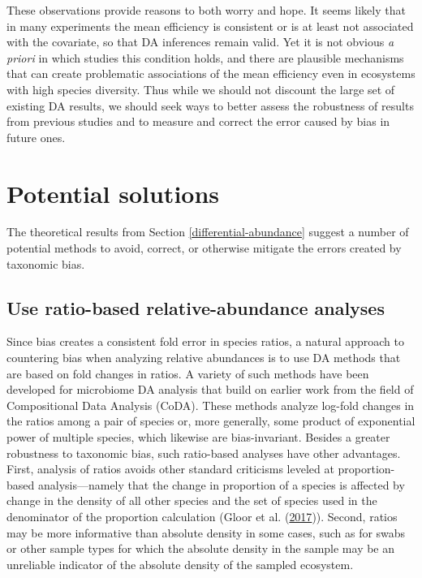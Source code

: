 \documentclass[
]{article}
\begin{document}
These observations provide reasons to both worry and hope.
It seems likely that in many experiments the mean efficiency is consistent or is at least not associated with the covariate, so that DA inferences remain valid.
Yet it is not obvious \emph{a priori} in which studies this condition holds, and there are plausible mechanisms that can create problematic associations of the mean efficiency even in ecosystems with high species diversity.
Thus while we should not discount the large set of existing DA results, we should seek ways to better assess the robustness of results from previous studies and to measure and correct the error caused by bias in future ones.

\hypertarget{solutions}{%
\section{Potential solutions}\label{solutions}}

The theoretical results from Section \ref{differential-abundance} suggest a number of potential methods to avoid, correct, or otherwise mitigate the errors created by taxonomic bias.

\hypertarget{use-ratio-based-relative-abundance-analyses}{%
\subsection{Use ratio-based relative-abundance analyses}\label{use-ratio-based-relative-abundance-analyses}}

Since bias creates a consistent fold error in species ratios, a natural approach to countering bias when analyzing relative abundances is to use DA methods that are based on fold changes in ratios.
A variety of such methods have been developed for microbiome DA analysis that build on earlier work from the field of Compositional Data Analysis (CoDA).
These methods analyze log-fold changes in the ratios among a pair of species or, more generally, some product of exponential power of multiple species, which likewise are bias-invariant.
Besides a greater robustness to taxonomic bias, such ratio-based analyses have other advantages.
First, analysis of ratios avoids other standard criticisms leveled at proportion-based analysis---namely that the change in proportion of a species is affected by change in the density of all other species and the set of species used in the denominator of the proportion calculation (Gloor et al. (\protect\hyperlink{ref-gloor2017micr}{2017})).
Second, ratios may be more informative than absolute density in some cases, such as for swabs or other sample types for which the absolute density in the sample may be an unreliable indicator of the absolute density of the sampled ecosystem.
\end{document}
